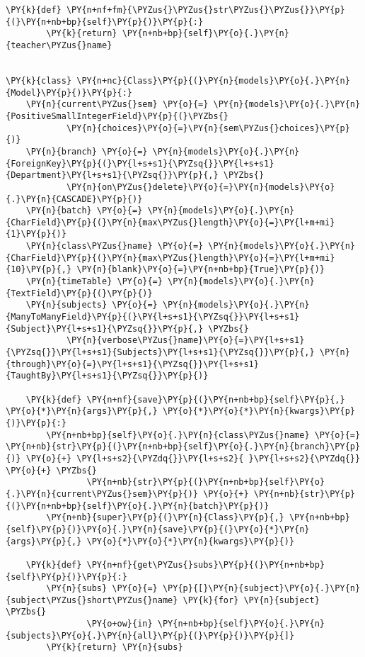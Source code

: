 \begin{Verbatim}[commandchars=\\\{\}]
    \PY{k}{def} \PY{n+nf+fm}{\PYZus{}\PYZus{}str\PYZus{}\PYZus{}}\PY{p}{(}\PY{n+nb+bp}{self}\PY{p}{)}\PY{p}{:}
        \PY{k}{return} \PY{n+nb+bp}{self}\PY{o}{.}\PY{n}{teacher\PYZus{}name}


\PY{k}{class} \PY{n+nc}{Class}\PY{p}{(}\PY{n}{models}\PY{o}{.}\PY{n}{Model}\PY{p}{)}\PY{p}{:}
    \PY{n}{current\PYZus{}sem} \PY{o}{=} \PY{n}{models}\PY{o}{.}\PY{n}{PositiveSmallIntegerField}\PY{p}{(}\PYZbs{}
            \PY{n}{choices}\PY{o}{=}\PY{n}{sem\PYZus{}choices}\PY{p}{)}
    \PY{n}{branch} \PY{o}{=} \PY{n}{models}\PY{o}{.}\PY{n}{ForeignKey}\PY{p}{(}\PY{l+s+s1}{\PYZsq{}}\PY{l+s+s1}{Department}\PY{l+s+s1}{\PYZsq{}}\PY{p}{,} \PYZbs{}
            \PY{n}{on\PYZus{}delete}\PY{o}{=}\PY{n}{models}\PY{o}{.}\PY{n}{CASCADE}\PY{p}{)}
    \PY{n}{batch} \PY{o}{=} \PY{n}{models}\PY{o}{.}\PY{n}{CharField}\PY{p}{(}\PY{n}{max\PYZus{}length}\PY{o}{=}\PY{l+m+mi}{1}\PY{p}{)}
    \PY{n}{class\PYZus{}name} \PY{o}{=} \PY{n}{models}\PY{o}{.}\PY{n}{CharField}\PY{p}{(}\PY{n}{max\PYZus{}length}\PY{o}{=}\PY{l+m+mi}{10}\PY{p}{,} \PY{n}{blank}\PY{o}{=}\PY{n+nb+bp}{True}\PY{p}{)}
    \PY{n}{timeTable} \PY{o}{=} \PY{n}{models}\PY{o}{.}\PY{n}{TextField}\PY{p}{(}\PY{p}{)}
    \PY{n}{subjects} \PY{o}{=} \PY{n}{models}\PY{o}{.}\PY{n}{ManyToManyField}\PY{p}{(}\PY{l+s+s1}{\PYZsq{}}\PY{l+s+s1}{Subject}\PY{l+s+s1}{\PYZsq{}}\PY{p}{,} \PYZbs{}
            \PY{n}{verbose\PYZus{}name}\PY{o}{=}\PY{l+s+s1}{\PYZsq{}}\PY{l+s+s1}{Subjects}\PY{l+s+s1}{\PYZsq{}}\PY{p}{,} \PY{n}{through}\PY{o}{=}\PY{l+s+s1}{\PYZsq{}}\PY{l+s+s1}{TaughtBy}\PY{l+s+s1}{\PYZsq{}}\PY{p}{)}

    \PY{k}{def} \PY{n+nf}{save}\PY{p}{(}\PY{n+nb+bp}{self}\PY{p}{,} \PY{o}{*}\PY{n}{args}\PY{p}{,} \PY{o}{*}\PY{o}{*}\PY{n}{kwargs}\PY{p}{)}\PY{p}{:}
        \PY{n+nb+bp}{self}\PY{o}{.}\PY{n}{class\PYZus{}name} \PY{o}{=} \PY{n+nb}{str}\PY{p}{(}\PY{n+nb+bp}{self}\PY{o}{.}\PY{n}{branch}\PY{p}{)} \PY{o}{+} \PY{l+s+s2}{\PYZdq{}}\PY{l+s+s2}{ }\PY{l+s+s2}{\PYZdq{}} \PY{o}{+} \PYZbs{}
                \PY{n+nb}{str}\PY{p}{(}\PY{n+nb+bp}{self}\PY{o}{.}\PY{n}{current\PYZus{}sem}\PY{p}{)} \PY{o}{+} \PY{n+nb}{str}\PY{p}{(}\PY{n+nb+bp}{self}\PY{o}{.}\PY{n}{batch}\PY{p}{)}
        \PY{n+nb}{super}\PY{p}{(}\PY{n}{Class}\PY{p}{,} \PY{n+nb+bp}{self}\PY{p}{)}\PY{o}{.}\PY{n}{save}\PY{p}{(}\PY{o}{*}\PY{n}{args}\PY{p}{,} \PY{o}{*}\PY{o}{*}\PY{n}{kwargs}\PY{p}{)}

    \PY{k}{def} \PY{n+nf}{get\PYZus{}subs}\PY{p}{(}\PY{n+nb+bp}{self}\PY{p}{)}\PY{p}{:}
        \PY{n}{subs} \PY{o}{=} \PY{p}{[}\PY{n}{subject}\PY{o}{.}\PY{n}{subject\PYZus{}short\PYZus{}name} \PY{k}{for} \PY{n}{subject} \PYZbs{}
                \PY{o+ow}{in} \PY{n+nb+bp}{self}\PY{o}{.}\PY{n}{subjects}\PY{o}{.}\PY{n}{all}\PY{p}{(}\PY{p}{)}\PY{p}{]}
        \PY{k}{return} \PY{n}{subs}


\end{Verbatim}
